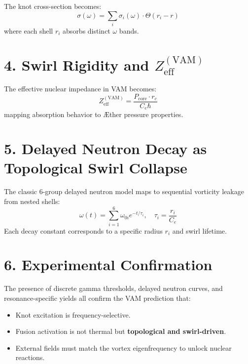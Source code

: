 \documentclass{article}
\begin{document}
The knot cross-section becomes:
\[
\sigma(\omega) = \sum_i \sigma_i(\omega) \cdot \Theta(r_i - r)
\]
where each shell $r_i$ absorbs distinct $\omega$ bands.

\section*{4. Swirl Rigidity and $Z_{\mathrm{eff}}^{(\mathrm{VAM})}$}
The effective nuclear impedance in VAM becomes:
\[
Z_{\mathrm{eff}}^{(\mathrm{VAM})} = \frac{P_{\mathrm{core}} \cdot r_c}{C_e \hbar}
\]
mapping absorption behavior to Æther pressure properties.

\section*{5. Delayed Neutron Decay as Topological Swirl Collapse}
The classic 6-group delayed neutron model maps to sequential vorticity leakage from nested shells:
\[
\omega(t) = \sum_{i=1}^6 \omega_{0i} e^{-t/\tau_i}, \quad \tau_i = \frac{r_i}{C_e}
\]
Each decay constant corresponds to a specific radius $r_i$ and swirl lifetime.

\section*{6. Experimental Confirmation}
The presence of discrete gamma thresholds, delayed neutron curves, and resonance-specific yields all confirm the VAM prediction that:
\begin{itemize}
  \item Knot excitation is frequency-selective.
  \item Fusion activation is not thermal but \textbf{topological and swirl-driven}.
  \item External fields must match the vortex eigenfrequency to unlock nuclear reactions.
\end{itemize}
\end{document}

